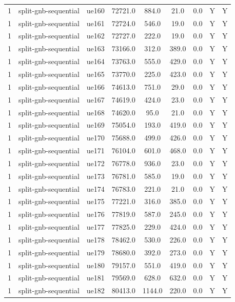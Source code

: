\begin{table}[ht]
\begin{tabular}{|c|c|c|c|c|c|c|c|c|}
1 & split-gnb-sequential & ue160 & 72721.0 & 884.0 & 21.0 & 0.0 & Y & Y \\
1 & split-gnb-sequential & ue161 & 72724.0 & 546.0 & 19.0 & 0.0 & Y & Y \\
1 & split-gnb-sequential & ue162 & 72727.0 & 222.0 & 19.0 & 0.0 & Y & Y \\
1 & split-gnb-sequential & ue163 & 73166.0 & 312.0 & 389.0 & 0.0 & Y & Y \\
1 & split-gnb-sequential & ue164 & 73763.0 & 555.0 & 429.0 & 0.0 & Y & Y \\
1 & split-gnb-sequential & ue165 & 73770.0 & 225.0 & 423.0 & 0.0 & Y & Y \\
1 & split-gnb-sequential & ue166 & 74613.0 & 751.0 & 29.0 & 0.0 & Y & Y \\
1 & split-gnb-sequential & ue167 & 74619.0 & 424.0 & 23.0 & 0.0 & Y & Y \\
1 & split-gnb-sequential & ue168 & 74620.0 & 95.0 & 21.0 & 0.0 & Y & Y \\
1 & split-gnb-sequential & ue169 & 75054.0 & 193.0 & 419.0 & 0.0 & Y & Y \\
1 & split-gnb-sequential & ue170 & 75688.0 & 499.0 & 426.0 & 0.0 & Y & Y \\
1 & split-gnb-sequential & ue171 & 76104.0 & 601.0 & 468.0 & 0.0 & Y & Y \\
1 & split-gnb-sequential & ue172 & 76778.0 & 936.0 & 23.0 & 0.0 & Y & Y \\
1 & split-gnb-sequential & ue173 & 76781.0 & 585.0 & 19.0 & 0.0 & Y & Y \\
1 & split-gnb-sequential & ue174 & 76783.0 & 221.0 & 21.0 & 0.0 & Y & Y \\
1 & split-gnb-sequential & ue175 & 77221.0 & 316.0 & 385.0 & 0.0 & Y & Y \\
1 & split-gnb-sequential & ue176 & 77819.0 & 587.0 & 245.0 & 0.0 & Y & Y \\
1 & split-gnb-sequential & ue177 & 77825.0 & 229.0 & 424.0 & 0.0 & Y & Y \\
1 & split-gnb-sequential & ue178 & 78462.0 & 530.0 & 226.0 & 0.0 & Y & Y \\
1 & split-gnb-sequential & ue179 & 78680.0 & 392.0 & 273.0 & 0.0 & Y & Y \\
1 & split-gnb-sequential & ue180 & 79157.0 & 551.0 & 419.0 & 0.0 & Y & Y \\
1 & split-gnb-sequential & ue181 & 79569.0 & 628.0 & 632.0 & 0.0 & Y & Y \\
1 & split-gnb-sequential & ue182 & 80413.0 & 1144.0 & 220.0 & 0.0 & Y & Y \\

\end{tabular}
\end{table}
